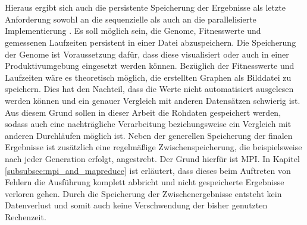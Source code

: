 \\\\
Hieraus ergibt sich auch die persistente Speicherung der Ergebnisse als letzte Anforderung sowohl an die sequenzielle als auch an die parallelisierte Implementierung . Es soll möglich sein, die Genome, Fitnesswerte und gemessenen Laufzeiten persistent in einer Datei abzuspeichern. Die Speicherung der Genome ist Voraussetzung dafür, dass diese visualisiert oder auch in einer Produktivumgebung eingesetzt werden können. Bezüglich der Fitnesswerte und Laufzeiten wäre es theoretisch möglich, die erstellten Graphen als Bilddatei zu speichern. Dies hat den Nachteil, dass die Werte nicht automatisiert ausgelesen werden können und ein genauer Vergleich mit anderen Datensätzen schwierig ist. Aus diesem Grund sollen in dieser Arbeit die Rohdaten gespeichert werden, sodass auch eine nachträgliche Verarbeitung beziehungsweise ein Vergleich mit anderen Durchläufen möglich ist. Neben der generellen Speicherung der finalen Ergebnisse ist zusätzlich eine regelmäßige Zwischenspeicherung, die beispielsweise nach jeder Generation erfolgt, angestrebt. Der Grund hierfür ist \ac{MPI}. In Kapitel \ref{subsubsec:mpi_and_mapreduce} ist erläutert, dass dieses beim Auftreten von Fehlern die Ausführung komplett abbricht und nicht gespeicherte Ergebnisse verloren gehen. Durch die Speicherung der Zwischenergebnisse entsteht kein Datenverlust und somit auch keine Verschwendung der bisher genutzten Rechenzeit.


